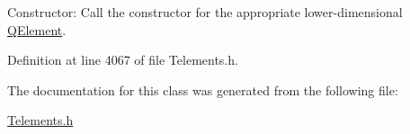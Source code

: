 Constructor\+: Call the constructor for the appropriate lower-\/dimensional \hyperlink{classoomph_1_1QElement}{Q\+Element}. 



Definition at line 4067 of file Telements.\+h.



The documentation for this class was generated from the following file\+:\begin{DoxyCompactItemize}
\item 
\hyperlink{Telements_8h}{Telements.\+h}\end{DoxyCompactItemize}

